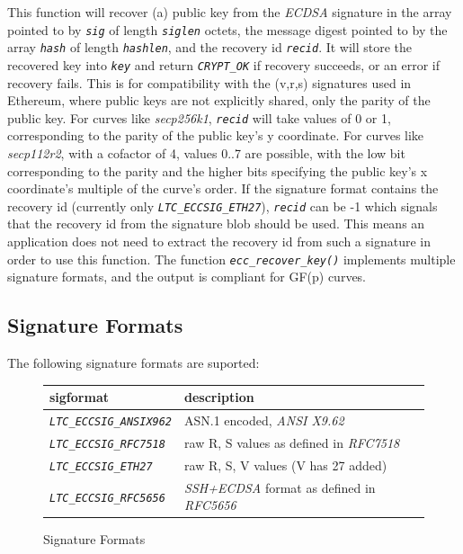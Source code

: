 \documentclass[synpaper]{book}
\newcommand{\code}[1]{\texttt{\textit{#1}}}
\begin{document}
This function will recover (a) public key from the \textit{ECDSA} signature in the array pointed to by \code{sig} of length \code{siglen} octets, the message digest
pointed to by the array \code{hash} of length \code{hashlen}, and the recovery id \code{recid}. It will store the recovered
key into \code{key} and return \code{CRYPT\_OK} if recovery succeeds, or an error if recovery fails.
This is for compatibility with the (v,r,s) signatures used in Ethereum, where public keys are not explicitly shared,
only the parity of the public key. For curves like \textit{secp256k1}, \code{recid} will take values of 0 or 1, corresponding to the
parity of the public key's y coordinate. For curves like \textit{secp112r2}, with a cofactor of 4, values 0..7 are possible,
with the low bit corresponding to the parity and the higher bits specifying the public key's x coordinate's multiple
of the curve's order.
If the signature format contains the recovery id (currently only \code{LTC\_ECCSIG\_ETH27}), \code{recid} can be -1
which signals that the recovery id from the signature blob should be used. This means an application does not need to
extract the recovery id from such a signature in order to use this function.
The function \code{ecc\_recover\_key()} implements multiple signature formats, and the output is compliant for GF(p) curves.

\subsection{Signature Formats}
\label{sigformat}
The following signature formats are suported:

\begin{figure}[hpbt]
\begin{small}
\begin{center}
\begin{tabular}{|l|l|}
\hline \textbf{sigformat} & \textbf{description} \\
\hline \code{LTC\_ECCSIG\_ANSIX962} & ASN.1 encoded, \textit{ANSI X9.62} \\
\hline \code{LTC\_ECCSIG\_RFC7518} & raw R, S values as defined in \textit{RFC7518} \\
\hline \code{LTC\_ECCSIG\_ETH27} & raw R, S, V values (V has 27 added) \\
\hline \code{LTC\_ECCSIG\_RFC5656} & \textit{SSH+ECDSA} format as defined in \textit{RFC5656} \\
\hline
\end{tabular}
\end{center}
\end{small}
\caption{Signature Formats}
\label{fig:sigformat}
\end{figure}
\end{document}
